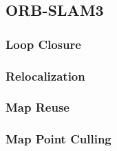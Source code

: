 \subsection{ORB-SLAM3}

\subsubsection{Loop Closure}
\subsubsection{Relocalization}
\subsubsection{Map Reuse}
\subsubsection{Map Point Culling}